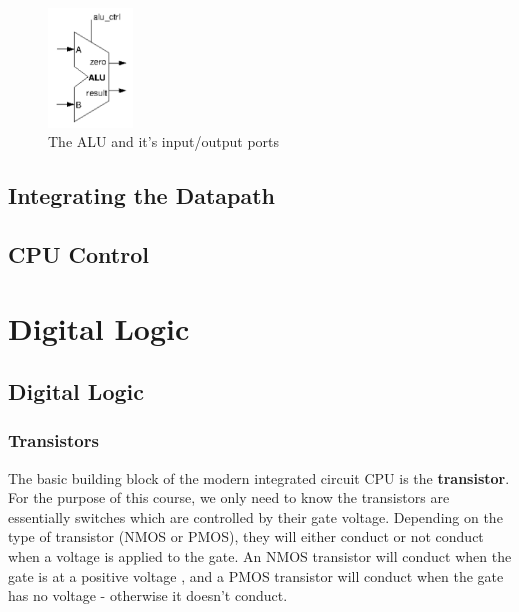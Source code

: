 \documentclass{article}
\begin{document}
	\begin{figure}[ht]
		\centering
		\includegraphics[width=0.2\textwidth]{alu}
		\caption{The ALU and it's input/output ports}
		\label{fig:alu}
	\end{figure}
	
	\subsection{Integrating the Datapath}
	\subsection{CPU Control}
	
	\section{Digital Logic}
	\subsection{Digital Logic}
	\subsubsection{Transistors}
	The basic building block of the modern integrated circuit CPU is the \textbf{transistor}. For the purpose of this course, we only need to know the transistors are essentially switches which are controlled by their gate voltage. Depending on the type of transistor (NMOS or PMOS), they will either conduct or not conduct when a voltage is applied to the gate. An NMOS transistor will conduct when the gate is at a positive voltage , and a PMOS transistor will conduct when the gate has no voltage - otherwise it doesn't conduct.
	
\end{document}
